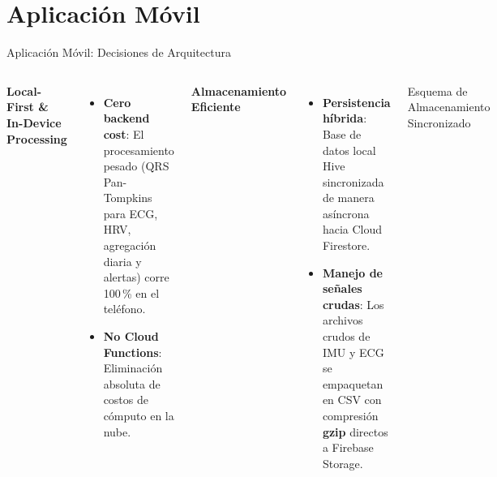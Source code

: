 \documentclass[aspectratio=169, 10pt]{beamer}
\begin{document}
\section{Aplicaci\'on M\'ovil}

\begin{frame}{Aplicaci\'on M\'ovil: Decisiones de Arquitectura}
    \begin{columns}[T]
        \footnotesize
        \textbf{Local-First \& In-Device Processing}
        \begin{itemize}\itemsep0.1cm
            \item \textbf{Cero backend cost}: El procesamiento pesado (QRS Pan-Tompkins para ECG, HRV, agregaci\'on diaria y alertas) corre 100\,\% en el tel\'efono.
            \item \textbf{No Cloud Functions}: Eliminaci\'on absoluta de costos de c\'omputo en la nube.
        \end{itemize}
        \vspace{0.15cm}
        \textbf{Almacenamiento Eficiente}
        \begin{itemize}\itemsep0.15cm
            \item \textbf{Persistencia h\'ibrida}: Base de datos local Hive sincronizada de manera as\'incrona hacia Cloud Firestore.
            \item \textbf{Manejo de se\~nales crudas}: Los archivos crudos de IMU y ECG se empaquetan en CSV con compresi\'on \textbf{gzip} directos a Firebase Storage.
        \end{itemize}
        \scriptsize
        \begin{block}{Esquema de Almacenamiento Sincronizado}
            \centering
\end{block}
\end{columns}
\end{frame}
\end{document}
